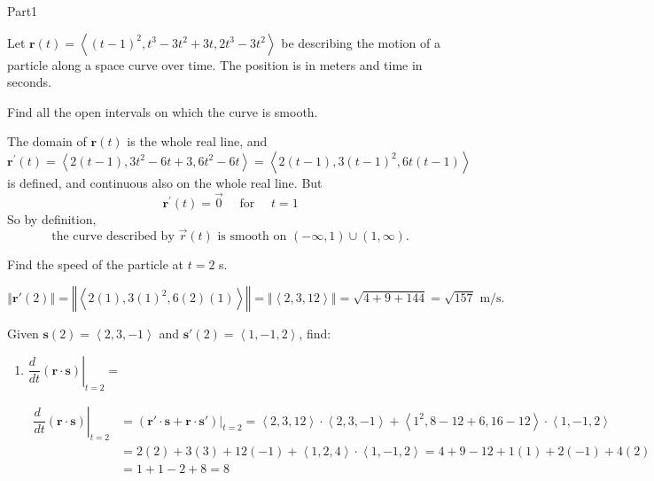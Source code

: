 \documentclass{report}
\newcommand{\norm}[1]{\left\Vert #1 \right\Vert}
\newcommand{\avec}[1]{\left\langle #1 \right\rangle}
\newcommand{\vect}[1]{\overrightarrow{#1}}
\begin{document}
\begin{exam}{Part1}
\begin{problem*}[\auto]Let $\mathbf{r}(t)=\avec{(t-1)^2,t^3-3t^2+3t,2t^3-3t^2}$ be describing the motion of a particle along a space curve over time. The position is in meters and time in seconds.
\begin{parts}
\item{} Find all the open intervals on which the curve is smooth.
\begin{solution}[2.5in]
The domain of $\mathbf{r}(t)$ is the whole real line, and $$\mathbf{r^\prime}(t)=\avec{2(t-1),3t^2-6t+3,6t^2-6t}=\avec{2(t-1),3(t-1)^2,6t(t-1)}$$ is defined, and continuous also on the whole real line. But 
$$\mathbf{r^\prime}(t)=\vect{0} \quad \text{ for }\quad t=1$$
So by definition,
$$\boxed{\text{the curve described by }\vec{r}(t) \text{ is smooth on }(-\infty,1)\cup(1,\infty).}$$
\end{solution}
\item{} Find the speed of the particle at $t=2$ s.
\begin{solution}[2.5in] 
$$\norm{\mathbf{r'}(2)}=\norm{\avec{2(1),3(1)^2,6(2)(1)}}=\norm{\avec{2,3,12}}=\sqrt{4+9+144}=\boxed{\sqrt{157}\text{ m/s}.} $$
\end{solution}
\item{} Given $\mathbf{s}(2)=\avec{2,3,-1}$ and $\mathbf{s'}(2)=\avec{1,-1,2}$, find:
\vskip0.2in
\begin{enumerate}
\item $\left.\dfrac{d\phantom{t}}{dt}\left(\mathbf{r} \cdot \mathbf{s} \right)\right|_{t=2}= $
\begin{solution}[1in]
\begin{align*}
\left.\dfrac{d\phantom{t}}{dt}\left(\mathbf{r} \cdot \mathbf{s} \right)\right|_{t=2}&= (\mathbf{r'}\cdot\mathbf{s}+\mathbf{r}\cdot\mathbf{s'})\Big|_{t=2}=\avec{2,3,12}\cdot\avec{2,3,-1}+\avec{1^2,8-12+6,16-12}\cdot\avec{1,-1,2}\\
&=2(2)+3(3)+12(-1)+\avec{1,2,4}\cdot\avec{1,-1,2}=4+9-12+1(1)+2(-1)+4(2)\\
&=1+1-2+8=8
\end{align*}
\end{solution}


\end{enumerate}
\end{parts}
\end{problem*}
\end{exam}
\end{document}
